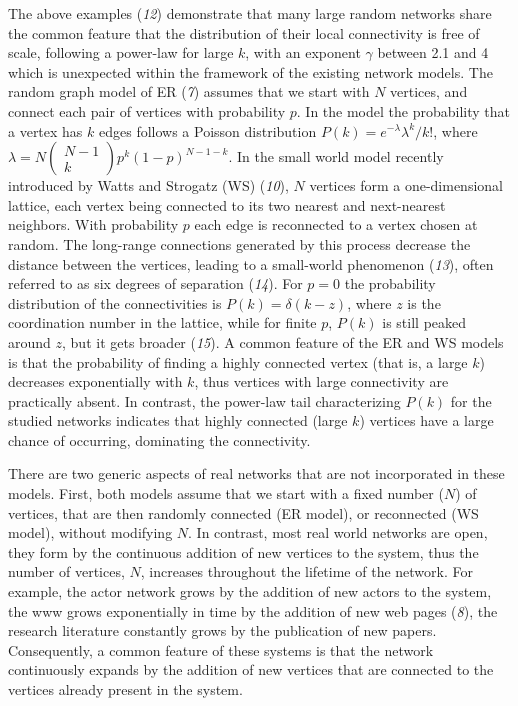 The  above examples ({\it 12}) demonstrate that many large random networks
share the common feature that the distribution of their local connectivity is free of scale, following a power-law for large $k$, with an exponent $\gamma$ between 2.1 and 4 which is unexpected within the framework  of the existing network models. The random graph model of ER ({\it 7}) assumes that we start with $N$ vertices, and connect each pair of vertices with probability $p$. In the model the probability that a vertex has $k$ edges follows a Poisson distribution $P(k)=e^{-\lambda}{\lambda}^k/k!$, where 
$\lambda=N\left(\begin{array}{c}N-1\\k\end{array}\right)p^k(1-p)^{N-1-k}$. In the small world model recently introduced by Watts and Strogatz (WS) ({\it 10}), $N$ vertices form a one-dimensional lattice, each vertex being connected to its two nearest and next-nearest neighbors.  With probability $p$ each edge is reconnected to a vertex chosen at random. The long-range connections generated by this process decrease the distance between the vertices, leading to a small-world phenomenon ({\it 13}), often referred to as six degrees of separation ({\it 14}). For $p=0$ the probability distribution of the connectivities is $P(k)=\delta(k-z)$, where $z$ is the coordination number in the lattice, while for finite $p$, $P(k)$ is still peaked around $z$, but it gets broader ({\it 15}). A common feature of the ER and WS models is that the probability of finding a highly connected vertex (that is, a large $k$) decreases exponentially with $k$, thus vertices with large connectivity are practically absent. In contrast, the power-law tail characterizing $P(k)$ for the studied networks indicates that highly connected  (large $k$) vertices have a large chance of occurring, dominating the connectivity.

There are two generic aspects of real networks that are not incorporated in these models. First, both models assume that we start with a fixed number ($N$) of vertices, that are then randomly connected (ER model), or reconnected (WS model), without modifying $N$. In contrast, most real world networks are open, they form by the continuous addition of new vertices to the system, thus the number of vertices, $N$, increases throughout the lifetime of the network. For example, the actor network grows by the addition of new actors to the system, the www grows exponentially in time by the addition of new web pages ({\it 8}), the research literature constantly grows by the publication of new papers. Consequently, a common feature of these systems is that the network continuously expands by the addition of new vertices that are connected to the vertices already present in the system.

